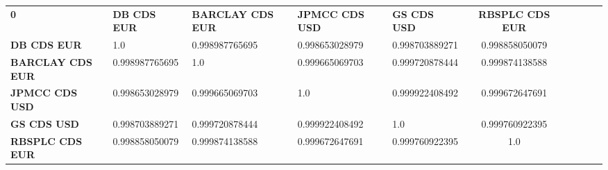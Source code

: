 \begin{center}
 \begin{tabular}{|l|l|l|l|l|c|c|c|c|c|}
\hline
\textbf{0} & \textbf{DB CDS EUR} & \textbf{BARCLAY CDS EUR} & \textbf{JPMCC CDS USD} & \textbf{GS CDS USD} & \textbf{RBSPLC CDS EUR}\\\hhline{|=|=|=|=|=|=|}
\textbf{DB CDS EUR} & 1.0 & 0.998987765695 & 0.998653028979 & 0.998703889271 & 0.998858050079\\
\textbf{BARCLAY CDS EUR} & 0.998987765695 & 1.0 & 0.999665069703 & 0.999720878444 & 0.999874138588\\
\textbf{JPMCC CDS USD} & 0.998653028979 & 0.999665069703 & 1.0 & 0.999922408492 & 0.999672647691\\
\textbf{GS CDS USD} & 0.998703889271 & 0.999720878444 & 0.999922408492 & 1.0 & 0.999760922395\\
\textbf{RBSPLC CDS EUR} & 0.998858050079 & 0.999874138588 & 0.999672647691 & 0.999760922395 & 1.0\\
\hline
\end{tabular}
\end{center}